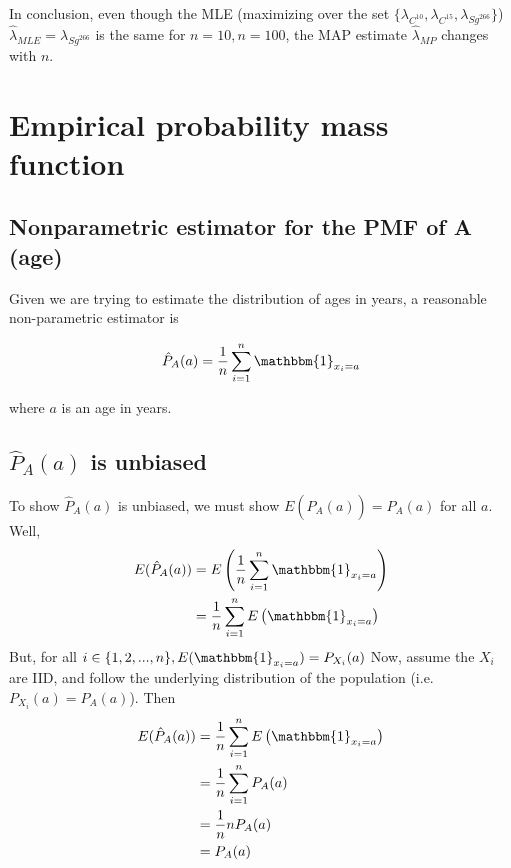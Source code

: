 \documentclass[paper=a4, fontsize=11pt]{scrartcl} %
\numberwithin{equation}{section} %
\numberwithin{figure}{section} %
\numberwithin{table}{section} %
\begin{document}
In conclusion, even though the MLE (maximizing over the set $\{\lambda_{C^{10}}, \lambda_{C^{15}}, \lambda_{Sg^{266}}\}$) $\hat{\lambda}_{MLE} = \lambda_{Sg^{266}} $ is the same for $n=10, n=100$, the MAP estimate $\hat{\lambda}_{MP}$ changes with $n$.



\section{Empirical probability mass function}

\subsection{Nonparametric estimator for the PMF of A (age)}

Given we are trying to estimate the distribution of ages in years, a reasonable non-parametric estimator is

\[\hat{P}_A(a) = \frac{1}{n} \sum_{i = 1}^{n} \mathbbm{1}_{x_i = a} \]

where $a$ is an age in years.

\subsection{$\hat{P}_A(a)$ is unbiased}

To show $\hat{P}_A(a)$ is unbiased, we must show $E(\hat{P}_A(a)) = P_A(a)$ for all $a$. Well,
\begin{align*}
E(\hat{P}_A(a)) &= E\left( \frac{1}{n} \sum_{i = 1}^{n} \mathbbm{1}_{x_i = a}\right) \\
   &=  \frac{1}{n} \sum_{i = 1}^{n} E\left(\mathbbm{1}_{x_i = a}\right)
\end{align*}
But, for all $i \in \{1, 2, ..., n\}, E(\mathbbm{1}_{x_i = a}) = P_{X_i}(a)$
Now, assume the $X_i$ are IID, and follow the underlying distribution of the population (i.e. $P_{X_i}(a) = P_A(a)$). Then
\begin{align*}
E(\hat{P}_A(a)) &=  \frac{1}{n} \sum_{i = 1}^{n} E\left(\mathbbm{1}_{x_i = a}\right)\\
   &= \frac{1}{n} \sum_{i = 1}^{n} P_A(a) \\
   &= \frac{1}{n} n P_A(a) \\
   &= P_A(a)
\end{align*}
\end{document}
